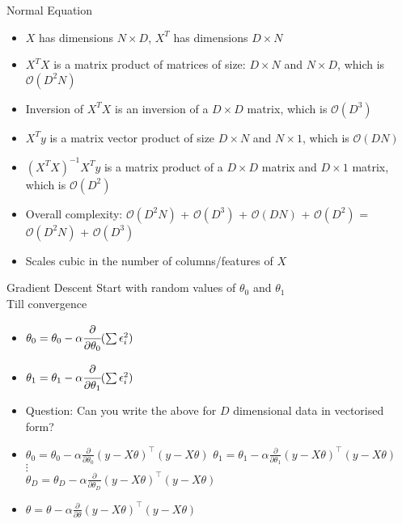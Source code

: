 \documentclass[usenames,dvipsnames]{beamer}
\begin{document}
\begin{frame}{Normal Equation}

\begin{itemize}[<+->]
	\item $X$ has dimensions $N\times D$, $X^T$ has dimensions $D \times N$
	\item $X^TX$ is a matrix product of matrices of size: $D \times N$ and $N \times D$, which is $\mathcal{O}(D^{2}N)$
	\item Inversion of $X^TX$ is an inversion of a $D\times D$ matrix, which is $\mathcal{O}(D^{3})$
	\item $X^Ty$ is a matrix vector product of size $D \times N$ and $N \times 1$, which is $\mathcal{O}(DN)$
	\item $(X^TX)^{-1}X^Ty$ is a matrix product of a  $D\times D$ matrix and $D \times 1$ matrix, which is $\mathcal{O}(D^2)$
	\item Overall complexity: $\mathcal{O}(D^{2}N)$ + $\mathcal{O}(D^{3})$ + $\mathcal{O}(DN)$ + $\mathcal{O}(D^2)$ = $\mathcal{O}(D^{2}N)$ + $\mathcal{O}(D^{3})$
	\item Scales cubic in the number of columns/features of $X$
\end{itemize}



\end{frame}


\begin{frame}{Gradient Descent}
Start with random values of $\theta_{0}$ and $\theta_{1}$\\
Till convergence
\begin{itemize}[<+->]
	\item $\theta_{0} = \theta_{0} - \alpha\cfrac{\partial}{\partial \theta_{0}} (\sum \epsilon_{i}^{2}) $
	\item $\theta_{1} = \theta_{1} - \alpha \cfrac{\partial}{\partial \theta_{1}} (\sum \epsilon_{i}^{2}) $
	\item Question: Can you write the above for $D$ dimensional data in vectorised form?
	\item	\(\theta_{0}=\theta_{0}-\alpha \frac{\partial}{\partial \theta_{0}}\left(y-X\theta\right)^{\top}\left(y-X\theta\right)\)
	\(\theta_{1}=\theta_{1}-\alpha \frac{\partial}{\partial \theta_{1}}\left(y-X\theta\right)^{\top}\left(y-X\theta\right)\) 
	\\ $\vdots$
	\\	\(\theta_{D}=\theta_{D}-\alpha \frac{\partial}{\partial \theta_{D}}\left(y-X\theta\right)^{\top}\left(y-X\theta\right)\)
	\item \(\theta=\theta - \alpha \frac{\partial}{\partial \theta}\left(y-X\theta\right)^{\top}\left(y-X\theta\right)\) 

\end{itemize}
\end{frame}
\end{document}
